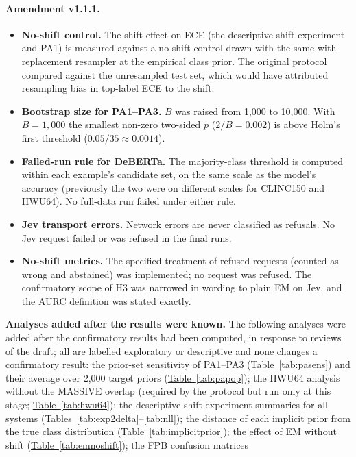 \paragraph{Amendment v1.1.1.}
\begin{itemize}
  \item \textbf{No-shift control.} The shift effect on ECE (the descriptive shift experiment and PA1) is measured against a no-shift control
  drawn with the same with-replacement resampler at the empirical class prior. The original protocol compared against
  the unresampled test set, which would have attributed resampling bias in top-label ECE to the shift.
  \item \textbf{Bootstrap size for PA1--PA3.} $B$ was raised from 1{,}000 to 10{,}000. With $B=1{,}000$ the smallest
  non-zero two-sided $p$ ($2/B=0.002$) is above Holm's first threshold ($0.05/35\approx0.0014$).
  \item \textbf{Failed-run rule for DeBERTa.} The majority-class threshold is computed within each example's candidate
  set, on the same scale as the model's accuracy (previously the two were on different scales for CLINC150 and HWU64).
  No full-data run failed under either rule.
  \item \textbf{Jev transport errors.} Network errors are never classified as refusals. No Jev request failed or was
  refused in the final runs.
  \item \textbf{No-shift metrics.} The specified treatment of refused requests (counted as wrong and abstained) was
  implemented; no request was refused. The confirmatory scope of H3 was narrowed in wording to plain EM on Jev, and
  the AURC definition was stated exactly.
\end{itemize}
\textbf{Analyses added after the results were known.} The following analyses were added after the confirmatory results
had been computed, in response to reviews of the draft; all are labelled exploratory or descriptive and none
changes a confirmatory result: the prior-set sensitivity of PA1--PA3 (\hyperref[tab:pasens]{Table~\ref*{tab:pasens}}) and their average over
2{,}000 target priors (\hyperref[tab:papop]{Table~\ref*{tab:papop}}); the HWU64 analysis without the MASSIVE overlap (required by the protocol
but run only at this stage; \hyperref[tab:hwu64]{Table~\ref*{tab:hwu64}}); the descriptive shift-experiment summaries for all systems
(\hyperref[tab:exp2delta]{Tables~\ref*{tab:exp2delta}}--\nobreak\ref{tab:nll}); the distance of each implicit prior from the true class distribution
(\hyperref[tab:implicitprior]{Table~\ref*{tab:implicitprior}}); the effect of EM without shift (\hyperref[tab:emnoshift]{Table~\ref*{tab:emnoshift}}); the FPB confusion matrices
